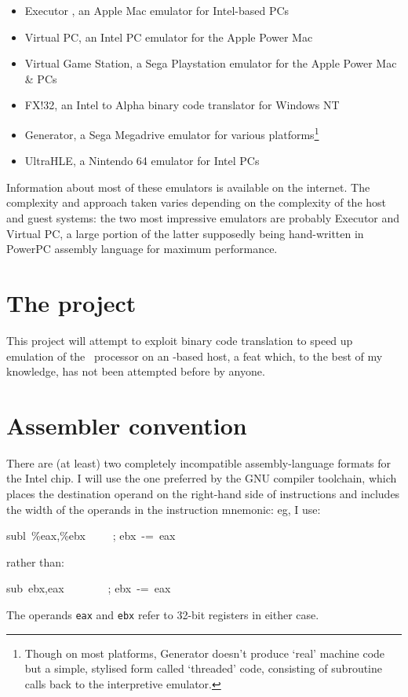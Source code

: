 \begin{itemize}

\item Executor \cite{Executor}, an Apple Mac emulator for Intel-based PCs
\item Virtual PC, an Intel PC emulator for the Apple Power Mac
\item Virtual Game Station, a Sega Playstation emulator for the Apple Power Mac \& PCs
\item FX!32, an Intel to Alpha binary code translator for Windows NT
\item Generator, a Sega Megadrive emulator for various platforms\footnote{Though on most platforms, Generator doesn't produce `real' machine code but a simple, stylised form called `threaded' code, consisting of subroutine calls back to the interpretive emulator.}
\item UltraHLE, a Nintendo 64 emulator for Intel PCs

\end{itemize}

Information about most of these emulators is available on the internet. The complexity and approach taken varies depending on the complexity of the host and guest systems: the two most impressive emulators are probably Executor and Virtual PC, a large portion of the latter supposedly being hand-written in PowerPC assembly language for maximum performance.

\section{The project}

This project will attempt to exploit binary code translation to speed up emulation of the \arm\ processor on an \ia-based host, a feat which, to the best of my knowledge, has not been attempted before by anyone.

\section{Assembler convention}

There are (at least) two completely incompatible assembly-language formats for the Intel chip. I will use the one preferred by the GNU compiler toolchain, which places the destination operand on the right-hand side of instructions and includes the width of the operands in the instruction mnemonic: eg, I use:

\begin{code}
subl~\%eax,\%ebx~~~~~; ebx~-=~eax
\end{code}

rather than:

\begin{code}
sub~ebx,eax~~~~~~~~; ebx~-=~eax
\end{code}

The operands {\tt eax} and {\tt ebx} refer to 32-bit registers in either case.
